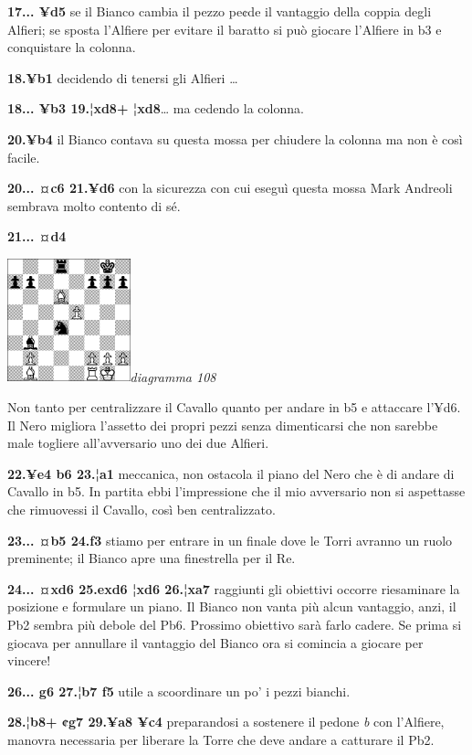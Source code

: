 \documentclass[
]{article}
\begin{document}
\textbf{17... ¥d5} se il Bianco cambia il pezzo pe¢de il vantaggio della
coppia degli Alfieri; se sposta l'Alfiere per evitare il baratto si può
giocare l'Alfiere in b3 e conquistare la colonna.

\textbf{18.¥b1} decidendo di tenersi gli Alfieri \ldots{}

\textbf{18... ¥b3 19.¦xd8+ ¦xd8}\ldots{} ma cedendo la colonna.

\textbf{20.¥b4} il Bianco contava su questa mossa per chiudere la
colonna ma non è così facile.

\textbf{20... ¤c6 21.¥d6} con la sicurezza con cui eseguì questa mossa
Mark Andreoli sembrava molto contento di sé.

\textbf{21... ¤d4}

\includegraphics[width=1.40139in,height=1.40139in]{vertopal_109f12be458a423d8f3cc838880eaea2/media/image108.png}\emph{diagramma
108}

Non tanto per centralizzare il Cavallo quanto per andare in b5 e
attaccare l'¥d6. Il Nero migliora l'assetto dei propri pezzi senza
dimenticarsi che non sarebbe male togliere all'avversario uno dei due
Alfieri.

\textbf{22.¥e4 b6 23.¦a1} meccanica, non ostacola il piano del Nero che
è di andare di Cavallo in b5. In partita ebbi l'impressione che il mio
avversario non si aspettasse che rimuovessi il Cavallo, così ben
centralizzato.

\textbf{23... ¤b5 24.f3} stiamo per entrare in un finale dove le Torri
avranno un ruolo preminente; il Bianco apre una finestrella per il Re.

\textbf{24... ¤xd6 25.exd6 ¦xd6 26.¦xa7} raggiunti gli obiettivi occorre
riesaminare la posizione e formulare un piano. Il Bianco non vanta più
alcun vantaggio, anzi, il Pb2 sembra più debole del Pb6. Prossimo
obiettivo sarà farlo cadere. Se prima si giocava per annullare il
vantaggio del Bianco ora si comincia a giocare per vincere!

\textbf{26... g6 27.¦b7 f5} utile a scoordinare un po' i pezzi bianchi.

\textbf{28.¦b8+ ¢g7 29.¥a8 ¥c4} preparandosi a sostenere il pedone
\emph{b} con l'Alfiere, manovra necessaria per liberare la Torre che
deve andare a catturare il Pb2.
\end{document}
